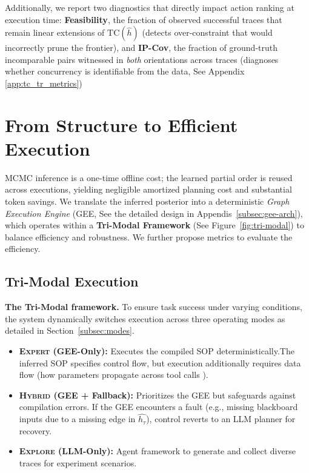\documentclass{article}
\theoremstyle{plain}
\theoremstyle{definition}
\theoremstyle{remark}
\begin{document}
Additionally, we report two diagnostics that directly impact action ranking at execution time:
\textbf{Feasibility}, the fraction of observed successful traces that remain linear extensions of
$\mathrm{TC}(\widehat{h})$ (detects over-constraint that would incorrectly prune the frontier), and
\textbf{IP-Cov}, the fraction of ground-truth incomparable pairs witnessed in \emph{both} orientations across traces
(diagnoses whether concurrency is identifiable from the data, See Appendix \ref{app:tc_tr_metrics})

\section{From Structure to Efficient Execution}
\label{sec:execution}
MCMC inference is a one-time offline cost; the learned partial order is reused across executions, yielding negligible amortized planning cost and substantial token savings. 
We translate the inferred posterior into a deterministic \emph{Graph Execution Engine} (GEE, See the detailed design in Appendis~\ref{subsec:gee-arch}), which operates within a \textbf{Tri-Modal Framework} (See Figure~\ref{fig:tri-modal}) to balance efficiency and robustness. We further propose metrics to evaluate the efficiency. 

\subsection{Tri-Modal Execution}
\noindent \textbf{The Tri-Modal framework.}
To ensure task success under varying conditions, the system dynamically switches execution across three operating modes as detailed in Section~\ref{subsec:modes}.
\begin{itemize}
    \item \textbf{\textsc{Expert} (GEE-Only):} Executes the compiled SOP deterministically.The inferred SOP specifies control flow, but execution additionally requires data flow (how parameters propagate across tool calls ).
    \item \textbf{\textsc{Hybrid} (GEE + Fallback):} Prioritizes the GEE but safeguards against compilation errors. If the GEE encounters a fault (e.g., missing blackboard inputs due to a missing edge in $\widehat{h_\tau}$), control reverts to an LLM planner for recovery.
    \item \textbf{\textsc{Explore} (LLM-Only):} Agent framework to generate and collect diverse traces for experiment scenarios.
\end{itemize}
\end{document}
